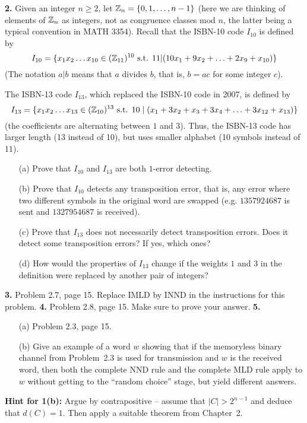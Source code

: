 \documentclass[12pt]{amsart}
\begin{document}
{\bf 2.} Given an integer $n\geq 2$, let ${\mathbb Z}_{n}=\{0,1,\ldots, n-1\}$ (here we are thinking of elements of ${\mathbb Z}_{n}$ as integers, not as congruence classes mod $n$, the latter being a typical convention in MATH 3354). Recall that the ISBN-10 code $I_{10}$ is defined by
$$I_{10}=\{x_1x_2\ldots x_{10}\in ({\mathbb Z}_{11})^{10}\mbox{ s.t. } 11 | (10x_1+9x_2+\ldots+2x_9+x_{10})\}$$
(The notation $a | b$ means that $a$ divides $b$, that is, $b=ac$ for some integer $c$).

The ISBN-13 code $I_{13}$, which replaced the ISBN-10 code in 2007, is defined by
$$I_{13}=\{x_1x_2\ldots x_{13}\in ({\mathbb Z}_{10})^{13}\mbox{ s.t. } 10\mid (x_1+3x_2+x_3+3x_4+\ldots+3x_{12}+x_{13})\}$$
(the coefficients are alternating between $1$ and $3$). Thus, the ISBN-13 code has larger length (13 instead of 10), but uses smaller alphabet (10 symbols instead of 11).
\begin{itemize}
\item[(a)] Prove that $I_{10}$ and $I_{13}$ are both $1$-error detecting.
\item[(b)] Prove that $I_{10}$ detects any transposition error, that is, any error where two different symbols in the original word are swapped (e.g.
$1357924687$ is sent and $1327954687$ is received).
\item[(c)] Prove that $I_{13}$ does not necessarily detect transposition errors. Does it detect some transposition errors? If yes, which ones?
\item[(d)] How would the properties of $I_{13}$ change if the weights $1$ and $3$ in the definition were replaced by another pair of integers?
 \end{itemize}
\skv

{\bf 3.} Problem 2.7, page 15. Replace IMLD by INND in the instructions for this problem.
\skv
{\bf 4.} Problem 2.8, page 15. Make sure to prove your answer.
\skv
{\bf 5.}
\begin{itemize} 
\item[(a)] Problem 2.3, page 15.
\item[(b)] Give an example of a word $w$ showing that if the memoryless binary channel from Problem~2.3 is used for transmission and $w$ is the received word, 
then both the complete NND rule and the complete MLD rule apply to $w$ without getting to the ``random choice'' stage, but yield different answers. 
\end{itemize}
\newpage
{\bf Hint for 1(b):} Argue by contrapositive -- assume that $|C|>2^{n-1}$ and deduce that $d(C)=1$. Then apply a suitable theorem from Chapter~2.
\end{document}
